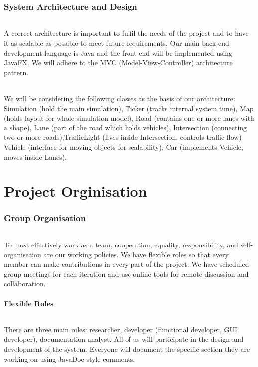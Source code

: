 \documentclass[11pt, a4paper]{article}
\begin{document}
\section{System Architecture and Design}\label{arch:desgn}
\paragraph{}
A correct architecture is important to fulfil the needs of the project and to have it as scalable as possible to meet future requirements. Our main back-end development language is Java and the front-end will be implemented using JavaFX. We will adhere to the MVC (Model-View-Controller) architecture pattern.
\paragraph{}
We will be considering the following classes as the basis of our architecture: Simulation (hold the main simulation), Ticker (tracks internal system time), Map (holds layout for whole simulation model), Road (contains one or more lanes with a shape), Lane (part of the road which holds vehicles), Intersection (connecting two or more roads),TrafficLight (lives inside Intersection, controls traffic flow) Vehicle (interface for moving objects for scalability), Car (implements Vehicle, moves inside Lanes).

\part*{Project Orginisation}
\section{Group Organisation}\label{proj:org}
\paragraph{}
To most effectively work as a team, cooperation, equality, responsibility, and self-organisation are our working policies. We have flexible roles so that every member can make contributions in every part of the project. We have scheduled group meetings for each iteration and use online tools for remote discussion and collaboration.

\subsection{Flexible Roles}\label{roles}
\paragraph{}
There are three main roles: researcher, developer (functional developer, GUI developer), documentation analyst. All of us will participate in the design and development of the system. Everyone will document the specific section they are working on using JavaDoc style comments.
\end{document}
